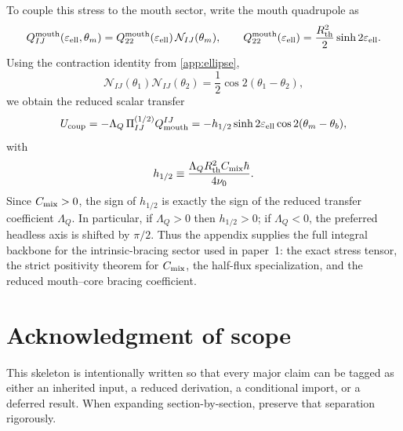 \documentclass[11pt]{article}
\theoremstyle{plain}
\theoremstyle{definition}
\theoremstyle{remark}
\newcommand{\Rth}{R_{\mathrm{th}}}
\newcommand{\epsell}{\varepsilon_{\mathrm{ell}}}
\newcommand{\thmouth}{\theta_m}
\begin{document}
To couple this stress to the mouth sector, write the mouth quadrupole as
\begin{equation}
Q_{IJ}^{\rm mouth}(\epsell,\thmouth)
=
Q_{22}^{\rm mouth}(\epsell)\,\mathcal N_{IJ}(\thmouth),
\qquad
Q_{22}^{\rm mouth}(\epsell)=\frac{\Rth^2}{2}\sinh 2\epsell.
\label{eq:stress-mouth-tensor}
\end{equation}
Using the contraction identity from \cref{app:ellipse},
\begin{equation}
\mathcal N_{IJ}(\theta_1)\mathcal N_{IJ}(\theta_2)
=
\frac12\cos 2(\theta_1-\theta_2),
\label{eq:stress-director-contraction}
\end{equation}
we obtain the reduced scalar transfer
\begin{equation}
U_{\rm coup}
=
-\Lambda_Q\,\Pi^{(1/2)}_{IJ}Q_{\rm mouth}^{IJ}
=
-h_{1/2}\sinh 2\epsell\cos 2(\thmouth-\theta_b),
\label{eq:stress-reduced-coupling}
\end{equation}
with
\begin{equation}
h_{1/2}
\equiv
\frac{\Lambda_Q\Rth^2 C_{\rm mix}\hbar}{4\nu_0}.
\label{eq:stress-h-half}
\end{equation}
Since \(C_{\rm mix}>0\), the sign of \(h_{1/2}\) is exactly the sign of the reduced transfer coefficient \(\Lambda_Q\). In particular, if \(\Lambda_Q>0\) then \(h_{1/2}>0\); if \(\Lambda_Q<0\), the preferred headless axis is shifted by \(\pi/2\). Thus the appendix supplies the full integral backbone for the intrinsic-bracing sector used in paper~1: the exact stress tensor, the strict positivity theorem for \(C_{\rm mix}\), the half-flux specialization, and the reduced mouth--core bracing coefficient.

\section*{Acknowledgment of scope}
This skeleton is intentionally written so that every major claim can be tagged as either an inherited input, a reduced derivation, a conditional import, or a deferred result. When expanding section-by-section, preserve that separation rigorously.
\end{document}
